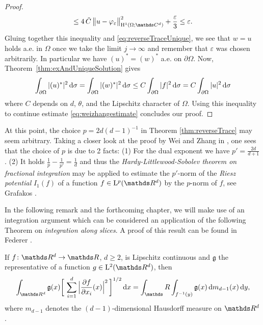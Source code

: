 \begin{proof}
\begin{align*}
    \leq 4 \, \tilde C \, \big\| u - \varphi_\varepsilon \big\|_{\HH^1(\Omega; \C^d)}^2 + \frac{\varepsilon}{3} 
    \leq \varepsilon.
  \end{align*}
  Gluing together this inequality and \eqref{eq:reverseTraceUnique}, we see that $w = u$ holds a.e. in $\Omega$ once we take the limit $j \to \infty$ and remember that $\varepsilon$ was chosen arbitrarily.
  In particular we have $(u)^* = (w)^*$ a.e. on $\partial\Omega$.
  Now, Theorem~\ref{thm:exAndUniqueSolution} gives
  \begin{align*}
    \int_{\partial\Omega} |(u)^*|^2 \, {\operatorname{d}\!{\sigma}} 
    = \int_{\partial\Omega} |(w)^*|^2 \, {\operatorname{d}\!{\sigma}}
    \leq C \int_{\partial\Omega} |f|^2 \, {\operatorname{d}\!{\sigma}} 
    = C \int_{\partial\Omega} |u|^2 \, {\operatorname{d}\!{\sigma}}
  \end{align*}
  where $C$ depends on $d$, $\theta$, and the Lipschitz character of $\Omega$.
  Using this inequality to continue estimate \ref{eq:weizhangestimate} concludes our proof.
\end{proof}

\begin{rem}
  At this point, the choice $p = {2d}({d - 1})^{-1}$ in Theorem \ref{thm:reverseTrace} may seem arbitrary.
  Taking a closer look at the proof by Wei and Zhang in \cite[Lem.\@~3.3]{weiZhang}, one sees that the choice of $p$ is due to 2 facts: (1) For the dual exponent we have $p' = \frac{2d}{d + 1}$. (2) It holds $\frac{1}{p} - \frac{1}{p'} = \frac{1}{d}$ and thus the \emph{Hardy-Littlewood-Sobolev theorem on fractional integration} may be applied to estimate the $p'$-norm of the \emph{Riesz potential} $I_1(f)$ of a function $f \in \Ell^p(\R^d)$ by the $p$-norm of $f$, see Grafakos \cite[Thm.\@~6.1.3]{grafakos2009modern}.
\end{rem}

In the following remark and the forthcoming chapter, we will make use of an integration argument which can be considered an application of the following Theorem on \emph{integration along slices}. A proof of this result can be found in Federer \cite[Thm.\@~3.2.12]{federer}.

\begin{thm}
  \label{thm:coarea}
  If $f \colon \R^d \to \R$, $d \geq 2$, is Lipschitz continuous and $\mathfrak{g}$ the representative of a function $g \in \Ell^2(\R^d)$, then
  \begin{align}
    \label{eq:coarea}
    \int_{\R^d} \mathfrak{g}(x) \bigg[ \, \sum_{i = 1}^d \Big|\frac{\partial f}{\partial x_i}(x)\Big|^2 \, \bigg]^{1/2} \d x 
    = \int_\R \int_{f^{-1}(y)} \mathfrak{g}(x) \d m_{d - 1}(x) \d y,
  \end{align}
  where $m_{d - 1}$ denotes the $(d - 1)$-dimensional Hausdorff measure on $\R^d$.
\end{thm}

